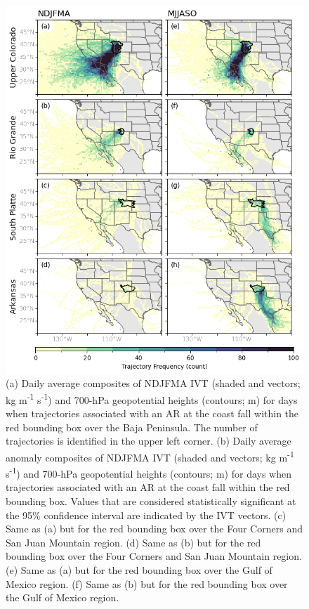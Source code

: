 \documentclass[draft]{agujournal2019}
\begin{document}
\begin{figure}
\noindent\includegraphics[width=\textwidth, height=\textheight, keepaspectratio]{fig5.png}

\caption{(a) Daily average composites of NDJFMA IVT (shaded and vectors; kg m\textsuperscript{-1} s\textsuperscript{-1}) and 700-hPa geopotential heights (contours; m) for days when trajectories associated with an AR at the coast fall within the red bounding box over the Baja Peninsula. The number of trajectories is identified in the upper left corner. (b) Daily average anomaly composites of NDJFMA IVT (shaded and vectors; kg m\textsuperscript{-1} s\textsuperscript{-1}) and 700-hPa geopotential heights (contours; m) for days when trajectories associated with an AR at the coast fall within the red bounding box. Values that are considered statistically significant at the 95\% confidence interval are indicated by the IVT vectors. (c) Same as (a) but for the red bounding box over the Four Corners and San Juan Mountain region. (d) Same as (b) but for the red bounding box over the Four Corners and San Juan Mountain region. (e) Same as (a) but for the red bounding box over the Gulf of Mexico region. (f) Same as (b) but for the red bounding box over the Gulf of Mexico region.}
\label{fig:composites_NDJFMA}
\end{figure}
\end{document}
